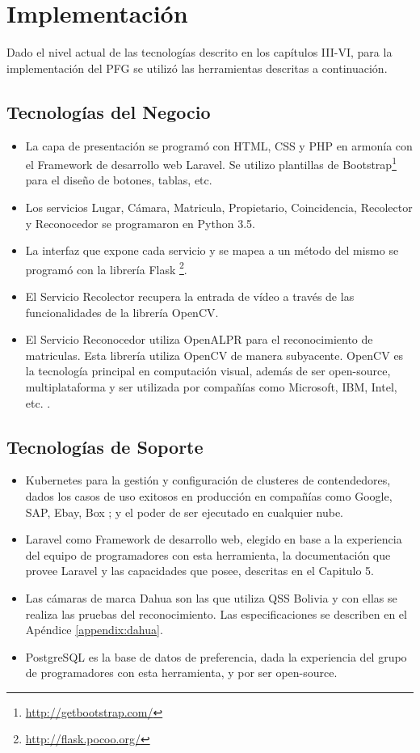 \chapter{Implementación}
Dado el nivel actual de las tecnologías descrito en los capítulos III-VI, para la implementación del PFG se utilizó las herramientas descritas a continuación.

\section{Tecnologías del Negocio}
\begin{itemize}
    \item La capa de presentación se programó con HTML, CSS y PHP en armonía con el Framework de desarrollo web Laravel. Se utilizo plantillas de Bootstrap\footnote{\url{http://getbootstrap.com/}} para el diseño de botones, tablas, etc.
    \item Los servicios Lugar, Cámara, Matricula, Propietario, Coincidencia, Recolector y Reconocedor se programaron en Python 3.5. 
    \item La interfaz que expone cada servicio y se mapea a un método del mismo se programó con la librería Flask
     \footnote{\url{http://flask.pocoo.org/}}.
    \item El Servicio Recolector recupera la entrada de vídeo a través de las funcionalidades de la librería OpenCV.
    \item El Servicio Reconocedor utiliza OpenALPR para el reconocimiento de matriculas. Esta librería utiliza OpenCV de manera subyacente. OpenCV es la tecnología principal en computación visual, además de ser open-source, multiplataforma y ser utilizada por compañías como Microsoft, IBM, Intel, etc. \cite{Itseez2000-he}.       
\end{itemize}

\section{Tecnologías de Soporte}
\begin{itemize}
    \item Kubernetes para la gestión y configuración de clusteres de contendedores, dados los casos de uso exitosos en producción en compañías como Google, SAP, Ebay, Box \cite{Kubernetes2016-ub}; y el poder de ser ejecutado en cualquier nube.
    
    \item Laravel como Framework de desarrollo web, elegido en base a la experiencia del equipo de programadores con esta herramienta, la documentación que provee Laravel y las capacidades que posee, descritas en el Capitulo 5.
        
    \item Las cámaras de marca Dahua son las que utiliza QSS Bolivia y con ellas se realiza las pruebas del reconocimiento. Las especificaciones se describen en el Apéndice \ref{appendix:dahua}.

    \item PostgreSQL es la base de datos de preferencia, dada la experiencia del grupo de programadores con esta herramienta, y por ser open-source.
\end{itemize}
